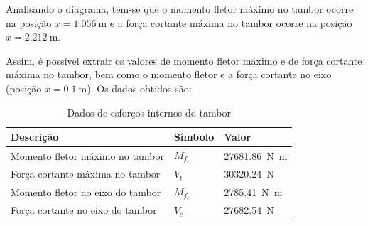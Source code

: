 Analisando o diagrama, tem-se que o momento fletor máximo no tambor ocorre na posição $x = \SI{1.056}{\meter}$ e a força cortante máxima no tambor ocorre na posição $x = \SI{2.212}{\meter}$.

Assim, é possível extrair os valores de momento fletor máximo e de força cortante máxima no tambor, bem como o momento fletor e a força cortante no eixo (posição $x = \SI{0.1}{\meter}$). Os dados obtidos são:

\begin{table}[H]
  \centering
  \caption{Dados de esforços internos do tambor}
  \label{tab:dados_esforcos_tambor}
  \begin{tabularx}{\textwidth}{>{\centering\arraybackslash}X>{\centering\arraybackslash}X>{\centering\arraybackslash}X}
    \toprule
    Descrição                        & Símbolo   & Valor                          \\
    \midrule
    Momento fletor máximo no tambor  & $M_{f_t}$ & \SI{27681.86}{\newton\meter} \\
    Força cortante máxima no tambor  & $V_t$     & \SI{30320.24}{\newton}       \\
    Momento fletor no eixo do tambor & $M_{f_e}$ & \SI{2785.41}{\newton\meter}  \\
    Força cortante no eixo do tambor & $V_e$     & \SI{27682.54}{\newton}       \\
    \bottomrule
  \end{tabularx}
\end{table}
